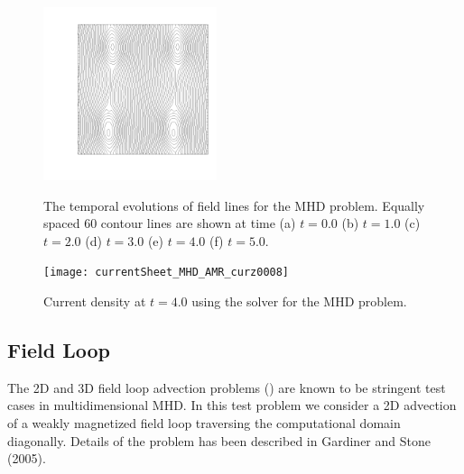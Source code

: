 \begin{figure}[t]
\begin{center}
{ \includegraphics[width=2.0in]{fieldLine_4}
}
\caption{\label{Fig:MHD_currentSheet}
  The temporal evolutions of field lines for the MHD  problem. Equally spaced 60 contour lines are shown at time (a) $t=0.0$  (b) $t=1.0$
  (c) $t=2.0$ (d) $t=3.0$ (e) $t=4.0$ (f) $t=5.0$.%
}
\end{center}
\end{figure}


\begin{figure}[!ht]
\begin{center}
{\leavevmode\texttt{[image: currentSheet\_MHD\_AMR\_curz0008]}}
\end{center}
\caption{\label{Fig:CurrentSheetJz} Current density at $t=4.0$ using the 
 solver for the MHD  problem.}
\end{figure}
\clearpage


\subsection{Field Loop}
The 2D and 3D field loop advection problems () are known to be stringent test cases in multidimensional MHD. In this test problem we consider a 2D advection of a weakly magnetized field loop traversing the computational domain diagonally. Details of the problem has been described in Gardiner and Stone (2005).



